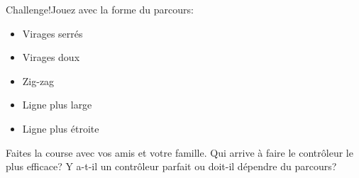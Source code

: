 \begin{bclogo}[couleur = pink!30, arrondi = 0.1, logo = \bccrayon, ombre = true]{Challenge!}Jouez avec la forme du parcours:

\begin{itemize}
\item Virages serrés
\item Virages doux
\item Zig-zag
\item Ligne plus large
\item Ligne plus étroite
\end{itemize}

Faites la course avec vos amis et votre famille. Qui arrive à faire le contrôleur le plus efficace? Y a-t-il un contrôleur parfait ou doit-il dépendre du parcours?
\end{bclogo}
